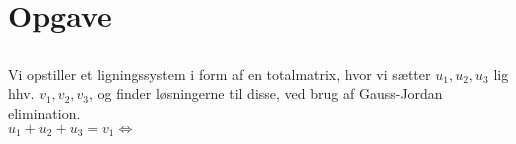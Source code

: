 \documentclass[a4paper,12pt]{article}
\begin{document}
\subsection{}


\subsection{}

\section[Opgave]{Opgave}
\subsection{}
Vi opstiller et ligningssystem i form af en totalmatrix, hvor vi sætter $u_1, u_2, u_3$ lig hhv. $v_1, v_2, v_3$, og finder løsningerne til disse, ved brug af Gauss-Jordan elimination.\\

$u_1 + u_2 + u_3 = v_1 \Leftrightarrow$\\
\end{document}
